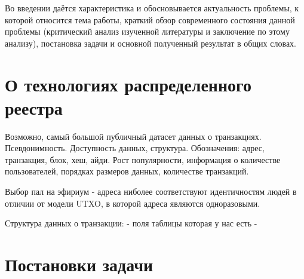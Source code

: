 \Introduction

Во введении даётся характеристика и обосновывается актуальность проблемы, к которой относится тема работы, краткий обзор современного состояния данной проблемы (критический анализ изученной литературы и заключение по этому анализу), постановка задачи и основной полученный результат в общих словах.

\section{О технологиях распределенного реестра}
Возможно, самый большой публичный датасет данных о транзакциях. Псевдонимность. Доступность данных, структура. Обозначения: адрес, транзакция, блок, хеш, айди.
Рост популярности, информация о количестве пользователей, порядках размеров данных, количестве транзакций. 

Выбор пал на эфириум - адреса ниболее соответствуют идентичностям людей в отличии от модели UTXO, в которой адреса являются одноразовыми. 

Структура данных о транзакции:
- поля таблицы которая у нас есть
- 


\section{Постановки задачи}